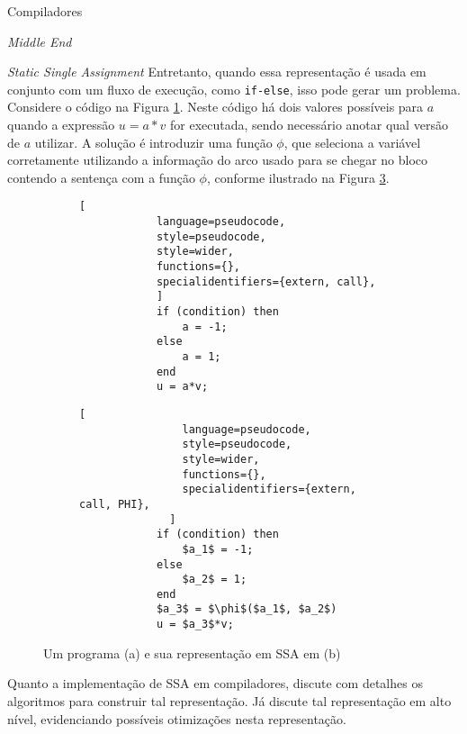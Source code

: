 \begin{section}{Compiladores}
\begin{subsection}{\textit{Middle End}}
\begin{subsubsection}{\textit{Static Single Assignment}}
Entretanto, quando essa representação é
usada em conjunto com um fluxo de execução, como \texttt{if-else}, isso pode gerar um problema. Considere o código
na Figura \ref{fig:code_normal}. Neste código há dois valores possíveis para
$a$ quando a expressão $u = a*v$ for executada, sendo necessário
anotar qual versão de $a$ utilizar. A solução é introduzir uma
função $\phi$, que seleciona a variável corretamente utilizando a informação
do arco usado para se chegar no bloco contendo a sentença com a função $\phi$,
conforme ilustrado na Figura \ref{fig:code_ssa_form}.

\begin{figure}[ht]
    \centering
    \begin{subfigure}[b]{0.40\textwidth}

        \begin{lstlisting}[
            language=pseudocode,
            style=pseudocode,
            style=wider,
            functions={},
            specialidentifiers={extern, call},
            ]
            if (condition) then
                a = -1;
            else
                a = 1;
            end
            u = a*v;
        \end{lstlisting}
        \caption{\label{fig:code_normal}}
    \end{subfigure}
    \begin{subfigure}[b]{0.40\textwidth}
        \begin{lstlisting}[
                language=pseudocode,
                style=pseudocode,
                style=wider,
                functions={},
                specialidentifiers={extern, call, PHI},
              ]
            if (condition) then
                $a_1$ = -1;
            else
                $a_2$ = 1;
            end
            $a_3$ = $\phi$($a_1$, $a_2$)
            u = $a_3$*v;
        \end{lstlisting}
        \caption{\label{fig:code_ssa_form}}
\end{subfigure}
\caption{Um programa (a) e sua representação em SSA em (b)}
\end{figure}

Quanto a implementação de SSA em compiladores, \cite{cytron1991efficiently}
discute com detalhes os algoritmos para construir tal representação. Já
\cite{appel2004modern} discute tal representação em alto nível, evidenciando
possíveis otimizações nesta representação.

\end{subsubsection}


\end{subsection}
\end{section}
